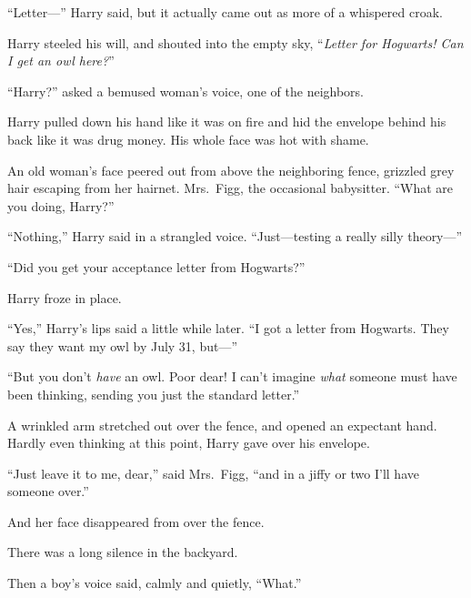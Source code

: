 “Letter—” Harry said, but it actually came out as more of a whispered croak.

Harry steeled his will, and shouted into the empty sky, “\emph{Letter for Hogwarts! Can I get an owl here?}”

“Harry?” asked a bemused woman’s voice, one of the neighbors.

Harry pulled down his hand like it was on fire and hid the envelope behind his back like it was drug money. His whole face was hot with shame.

An old woman’s face peered out from above the neighboring fence, grizzled grey hair escaping from her hairnet. Mrs.~Figg, the occasional babysitter. “What are you doing, Harry?”

“Nothing,” Harry said in a strangled voice. “Just—testing a really silly theory—”

“Did you get your acceptance letter from Hogwarts?”

Harry froze in place.

“Yes,” Harry’s lips said a little while later. “I got a letter from Hogwarts. They say they want my owl by July 31\St, but—”

“But you don’t \emph{have} an owl. Poor dear! I can’t imagine \emph{what} someone must have been thinking, sending you just the standard letter.”

A wrinkled arm stretched out over the fence, and opened an expectant hand. Hardly even thinking at this point, Harry gave over his envelope.

“Just leave it to me, dear,” said Mrs.~Figg, “and in a jiffy or two I’ll have someone over.”

And her face disappeared from over the fence.

There was a long silence in the backyard.

Then a boy’s voice said, calmly and quietly, “What.”

